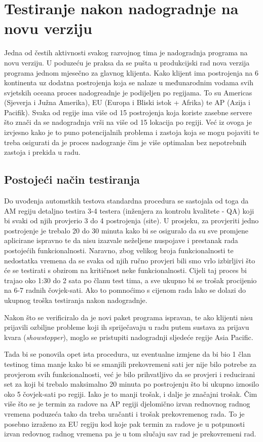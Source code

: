 \chapter{Testiranje nakon nadogradnje na novu verziju}\label{postdeploy}

Jedna od čestih aktivnosti svakog razvojnog tima je nadogradnja programa na novu verziju.
U poduzeću je praksa da se pušta u produkcijski rad nova verzija programa jednom mjesečno za glavnog klijenta. 
Kako klijent ima postrojenja na 6 kontinenta uz dodatna postrojenja koja se nalaze u međunarodnim vodama svih svjetskih oceana proces nadogreadnje je podijeljen po regijama.
To su Americas (Sjeverja i Južna Amerika), EU (Europa i Bliski istok + Afrika) te AP (Azija i Pacifik).
Svaka od regije ima više od 15 postrojenja koja koriste zasebne servere što znači da se nadogradnja vrši na više od 15 lokacija po regiji.
Već iz ovoga je izvjesno kako je to puno potencijalnih problema i zastoja koja se mogu pojaviti te treba osigurati da je proces nadogranje čim je više optimalan bez nepotrebnih zastoja i prekida u radu.

\section{Postojeći način testiranja}\label{current_postdeploy}
Do uvođenja automstkih testova standardna procedura se sastojala od toga da AM regiju detaljno testira 3-4 testera (inženjera za kontrolu kvalitete - QA) koji bi svaki od njih provjerio 3 do 4 postrojenja (site).
U prosjeku, za provjeriti jedno postrojenje je trebalo 20 do 30 minuta kako bi se osiguralo da su sve promjene aplicirane ispravno te da nisu izazvale neželjene nuspojave i prestanak rada postojećih funkcionalnosti.
Naravno, zbog velikog broja funkcionalnosti te nedostatka vremena da se svaka od njih ručno provjeri bili smo vrlo izbirljivi što će se testirati s obzirom na kritičnost neke funkcionalnosti.
Cijeli taj proces bi trajao oko 1:30 do 2 sata po članu test tima, a sve ukupno bi se trošak procijenio na 6-7 radnih čovjek-sati.
Ako to pomnoćimo s cijenom rada lako se dolazi do ukupnog troška testiranja nakon nadogradnje.

Nakon što se verificiralo da je novi paket programa ispravan, te ako klijenti nisu prijavili ozbiljne probleme koji ih spriječavaju u radu putem sustava za prijavu kvara (\emph{showstopper}), moglo se pristupiti nadogradnji sljedeće regije Asia Pacific.

Tada bi se ponovila opet ista procedura, uz eventualne izmjene da bi bio 1 član testinog tima manje kako bi se smanjili prekovremeni sati jer nije bilo potrebe za provjerom svih funkcionalnosti, već je bilo prihvatljivo da se provjeri i reducirani set za koji bi trebalo maksimalno 20 minuta po postrojenju što bi ukupno iznosilo oko 5 čovjek-sati po regiji.
Iako je to manji trošak, i dalje je značajni trošak. 
Čim više što se je termin za radove na AP regiji djelomično izvan rednovnog radnog vremena poduzeća tako da treba uračanti i trošak prekovremenog rada.
To je posebno izraženo za EU regiju kod koje pak termin za radove je u potpunosti izvan redovnog radnog vremena pa je u tom slučaju sav rad je prekovremeni rad.  

